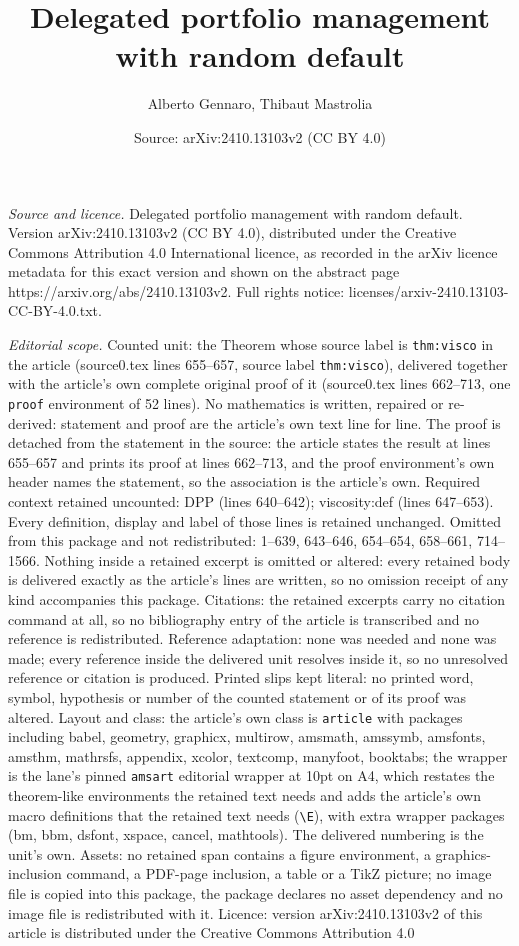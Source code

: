 \documentclass[10pt,a4paper]{amsart}
\title[Delegated portfolio management with random default]{Delegated portfolio management with random default}
\author{Alberto Gennaro, Thibaut Mastrolia}
\date{Source: arXiv:2410.13103v2 (CC BY 4.0)}
\begin{document}
\maketitle

\noindent\emph{Source and licence.} Delegated portfolio management with random default. Version arXiv:2410.13103v2 (CC BY 4.0), distributed under the Creative Commons Attribution 4.0 International licence, as recorded in the arXiv licence metadata for this exact version and shown on the abstract page https://arxiv.org/abs/2410.13103v2. Full rights notice: licenses/arxiv-2410.13103-CC-BY-4.0.txt.\par\smallskip

\noindent\textit{Editorial scope.} Counted unit: the Theorem whose source label is \texttt{thm:visco} in the article (source0.tex lines 655--657, source label \texttt{thm:visco}), delivered together with the article's own complete original proof of it (source0.tex lines 662--713, one \texttt{proof} environment of 52 lines). No mathematics is written, repaired or re-derived: statement and proof are the article's own text line for line. The proof is detached from the statement in the source: the article states the result at lines 655--657 and prints its proof at lines 662--713, and the proof environment's own header names the statement, so the association is the article's own. Required context retained uncounted: DPP (lines 640--642); viscosity:def (lines 647--653). Every definition, display and label of those lines is retained unchanged. Omitted from this package and not redistributed: 1--639, 643--646, 654--654, 658--661, 714--1566. Nothing inside a retained excerpt is omitted or altered: every retained body is delivered exactly as the article's lines are written, so no omission receipt of any kind accompanies this package. Citations: the retained excerpts carry no citation command at all, so no bibliography entry of the article is transcribed and no reference is redistributed. Reference adaptation: none was needed and none was made; every reference inside the delivered unit resolves inside it, so no unresolved reference or citation is produced. Printed slips kept literal: no printed word, symbol, hypothesis or number of the counted statement or of its proof was altered. Layout and class: the article's own class is \texttt{article} with packages including babel, geometry, graphicx, multirow, amsmath, amssymb, amsfonts, amsthm, mathrsfs, appendix, xcolor, textcomp, manyfoot, booktabs; the wrapper is the lane's pinned \texttt{amsart} editorial wrapper at 10pt on A4, which restates the theorem-like environments the retained text needs and adds the article's own macro definitions that the retained text needs (\texttt{\textbackslash E}), with extra wrapper packages (bm, bbm, dsfont, xspace, cancel, mathtools). The delivered numbering is the unit's own. Assets: no retained span contains a figure environment, a graphics-inclusion command, a PDF-page inclusion, a table or a TikZ picture; no image file is copied into this package, the package declares no asset dependency and no image file is redistributed with it. Licence: version arXiv:2410.13103v2 of this article is distributed under the Creative Commons Attribution 4.0 
\end{document}
